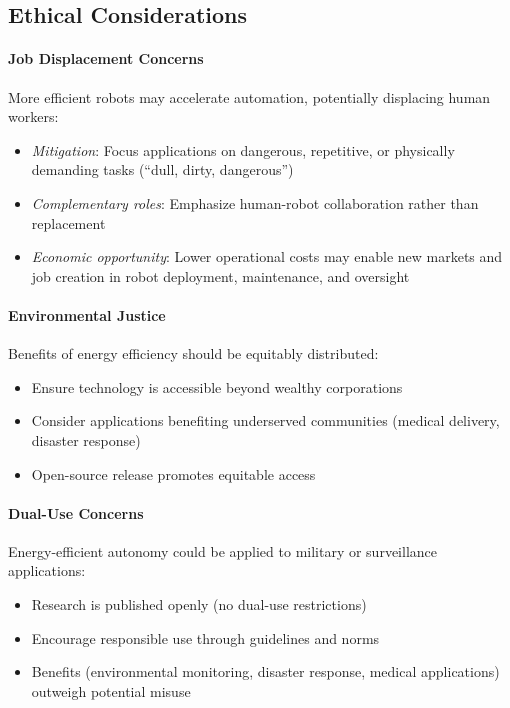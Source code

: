 \subsection{Ethical Considerations}

\paragraph{Job Displacement Concerns}
More efficient robots may accelerate automation, potentially displacing human workers:
\begin{itemize}
    \item \textit{Mitigation}: Focus applications on dangerous, repetitive, or physically demanding tasks (``dull, dirty, dangerous'')
    \item \textit{Complementary roles}: Emphasize human-robot collaboration rather than replacement
    \item \textit{Economic opportunity}: Lower operational costs may enable new markets and job creation in robot deployment, maintenance, and oversight
\end{itemize}

\paragraph{Environmental Justice}
Benefits of energy efficiency should be equitably distributed:
\begin{itemize}
    \item Ensure technology is accessible beyond wealthy corporations
    \item Consider applications benefiting underserved communities (medical delivery, disaster response)
    \item Open-source release promotes equitable access
\end{itemize}

\paragraph{Dual-Use Concerns}
Energy-efficient autonomy could be applied to military or surveillance applications:
\begin{itemize}
    \item Research is published openly (no dual-use restrictions)
    \item Encourage responsible use through guidelines and norms
    \item Benefits (environmental monitoring, disaster response, medical applications) outweigh potential misuse
\end{itemize}

